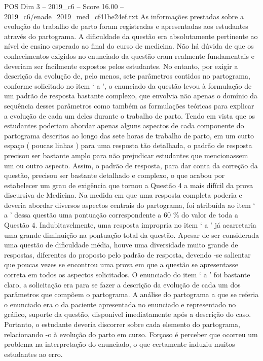 \begin{textsample}{POS Dim 3 – 2019\_c6 – Score 16.00 – 2019\_c6/enade\_2019\_med\_cf41be24ef.txt}
As informações prestadas sobre a evolução do trabalho de parto foram registradas e apresentadas aos estudantes através do partograma.
A dificuldade da questão era absolutamente pertinente ao nível de ensino esperado ao final do curso de medicina.
Não há dúvida de que os conhecimentos exigidos no enunciado da questão eram realmente fundamentais e deveriam ser facilmente expostos pelos estudantes.
No entanto, por exigir a descrição da evolução de, pelo menos, sete parâmetros contidos no partograma, conforme solicitado no item ‘ a ’, o enunciado da questão levou à formulação de um padrão de resposta bastante complexo, que envolvia não apenas o domínio da sequência desses parâmetros como também as formulações teóricas para explicar a evolução de cada um deles durante o trabalho de parto.
Tendo em vista que os estudantes poderiam abordar apenas alguns aspectos de cada componente do partograma descritos ao longo das sete horas de trabalho de parto, em um curto espaço ( poucas linhas ) para uma resposta tão detalhada, o padrão de resposta precisou ser bastante amplo para não prejudicar estudantes que mencionassem um ou outro aspecto.
Assim, o padrão de resposta, para dar conta da correção da questão, precisou ser bastante detalhado e complexo, o que acabou por estabelecer um grau de exigência que tornou a Questão 4 a mais difícil da prova discursiva de Medicina.
Na medida em que uma resposta completa poderia e deveria abordar diversos aspectos centrais do partograma, foi atribuída ao item ‘ a ’ dessa questão uma pontuação correspondente a 60 \% do valor de toda a Questão 4.
Indubitavelmente, uma resposta impropria no item ‘ a ’ já acarretaria uma grande diminuição na pontuação total da questão.
Apesar de ser considerada uma questão de dificuldade média, houve uma diversidade muito grande de respostas, diferentes do proposto pelo padrão de resposta, devendo -se salientar que poucas vezes se encontrou uma prova em que a questão se apresentasse correta em todos os aspectos solicitados.
O enunciado do item ‘ a ’ foi bastante claro, a solicitação era para se fazer a descrição da evolução de cada um dos parâmetros que compõem o partograma.
A análise do partograma a que se referia o enunciado era o da paciente apresentada no enunciado e representado no gráfico, suporte da questão, disponível imediatamente após a descrição do caso.
Portanto, o estudante deveria discorrer sobre cada elemento do partograma, relacionando -o à evolução do parto em curso.
Forçoso é perceber que ocorreu um problema na interpretação do enunciado, o que certamente induziu muitos estudantes ao erro.

\end{textsample}
